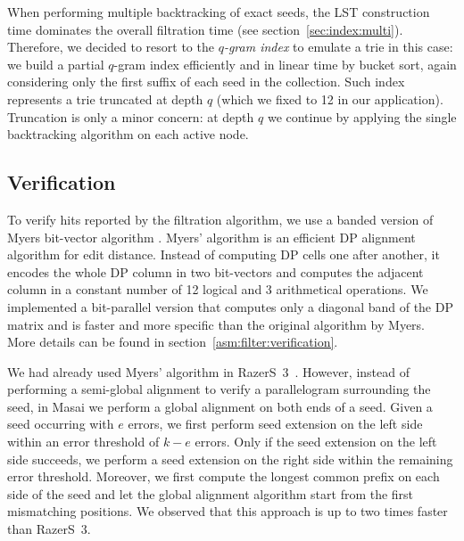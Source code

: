When performing multiple backtracking of exact seeds, the LST construction time dominates the overall filtration time (see section~\ref{sec:index:multi}).
Therefore, we decided to resort to the \emph{$q$-gram index} to emulate a trie in this case:
we build a partial $q$-gram index efficiently and in linear time by bucket sort, again considering only the first suffix of each seed in the collection.
Such index represents a trie truncated at depth $q$ (which we fixed to 12 in our application).
Truncation is only a minor concern: at depth $q$ we continue by applying the single backtracking algorithm on each active node.

\subsection{Verification}
\label{masai:engineering:extension}

To verify hits reported by the filtration algorithm, we use a banded version of Myers bit-vector algorithm \citep{Myers1999}.
Myers' algorithm is an efficient DP alignment algorithm \citep{Needleman1970} for edit distance. 
Instead of computing DP cells one after another, it encodes the whole DP column in two bit-vectors and computes the adjacent column in a constant number of 12 logical and 3 arithmetical operations.
We implemented a bit-parallel version that computes only a diagonal band of the DP matrix and is faster and more specific than the original algorithm by Myers.
More details can be found in section~\ref{asm:filter:verification}.

We had already used Myers' algorithm in RazerS~3~\citep{RazerS3}.
However, instead of performing a semi-global alignment to verify a parallelogram surrounding the seed, in Masai we perform a global alignment on both ends of a seed.
Given a seed occurring with $e$ errors, we first perform seed extension on the left side within an error threshold of $k - e$ errors.
Only if the seed extension on the left side succeeds, we perform a seed extension on the right side within the remaining error threshold.
Moreover, we first compute the longest common prefix on each side of the seed and let the global alignment algorithm start from the first mismatching positions.
We observed that this approach is up to two times faster than RazerS~3.



